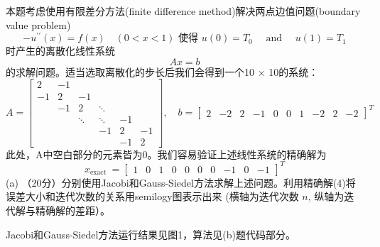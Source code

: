 \documentclass[12pt,a4paper,UTF8]{ctexart}
\begin{document}
\begin{enumerate}
          本题考虑使用有限差分方法(finite difference method)解决两点边值问题(boundary
          value problem)
          \begin{equation}
              -u^{\prime \prime}(x)=f(x) \quad(0<x<1) \text { 使得 } u(0)=T_{0} \quad \text { and } \quad u(1)=T_{1}
          \end{equation}
          时产生的离散化线性系统
          \begin{equation}
              A x=b
          \end{equation}
          的求解问题。适当选取离散化的步长后我们会得到一个10 × 10的系统：
          \begin{equation}
              A=\left[\begin{array}{rrrrrrrr}
                      2  & -1 &        &        &    &    \\
                      -1 & 2  & -1     &        &    &    \\
                         & -1 & 2      & \ddots &    &    \\
                         &    & \ddots & \ddots & -1 &    \\
                         &    &        & -1     & 2  & -1 \\
                         &    &        &        & -1 & 2
                  \end{array}\right], \quad b=\left[\begin{array}{llllllllll}
                      2 & -2 & 2 & -1 & 0 & 0 & 1 & -2 & 2 & -2
                  \end{array}\right]^{T}
          \end{equation}
          此处，A中空白部分的元素皆为0。我们容易验证上述线性系统的精确解为
          \begin{equation}\label{eq4}
              x_{\text {exact }}=\left[\begin{array}{llllllllll}
                      1 & 0 & 1 & 0 & 0 & 0 & 0 & -1 & 0 & -1
                  \end{array}\right]^{T}
          \end{equation}
          (a) （20分）分别使用Jacobi和Gauss-Siedel方法求解上述问题。利用精确解(4)将误差大小和迭代次数的关系用semilogy图表示出来 (横轴为迭代次数 $n$, 纵轴为迭代解与精确解的差距）。

          Jacobi和Gauss-Siedel方法运行结果见图1，算法见(b)题代码部分。


\end{enumerate}
\end{document}

